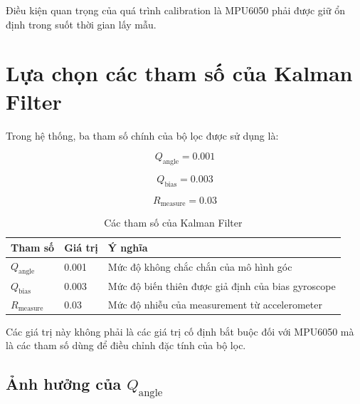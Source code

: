 Điều kiện quan trọng của quá trình calibration là MPU6050 phải được giữ ổn định trong suốt thời gian lấy mẫu.


\section{Lựa chọn các tham số của Kalman Filter}
\label{sec:kalman-parameters}

Trong hệ thống, ba tham số chính của bộ lọc được sử dụng là:

\begin{equation}
Q_{\text{angle}}=0.001
\end{equation}

\begin{equation}
Q_{\text{bias}}=0.003
\end{equation}

\begin{equation}
R_{\text{measure}}=0.03
\end{equation}

\begin{table}[H]
    \centering
    \caption{Các tham số của Kalman Filter}
    \label{tab:kalman-parameters}
    \begin{tabular}{p{4cm} p{3cm} p{7cm}}
        \toprule
        \textbf{Tham số}
        & \textbf{Giá trị}
        & \textbf{Ý nghĩa} \\
        \midrule
        $Q_{\text{angle}}$
        & 0.001
        & Mức độ không chắc chắn của mô hình góc \\

        $Q_{\text{bias}}$
        & 0.003
        & Mức độ biến thiên được giả định của bias gyroscope \\

        $R_{\text{measure}}$
        & 0.03
        & Mức độ nhiễu của measurement từ accelerometer \\
        \bottomrule
    \end{tabular}
\end{table}

Các giá trị này không phải là các giá trị cố định bắt buộc đối với MPU6050 mà là các tham số dùng để điều chỉnh đặc tính của bộ lọc.

\subsection{Ảnh hưởng của \texorpdfstring{$Q_{\text{angle}}$}{Q\_angle}}

